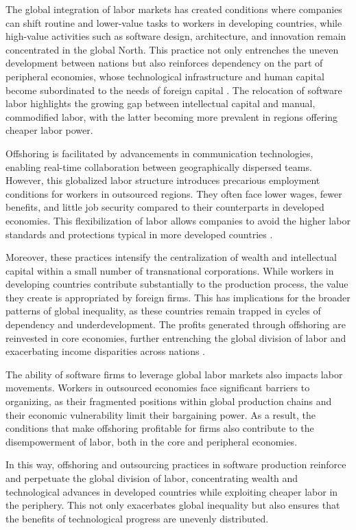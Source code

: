 \begin{refsection}
The global integration of labor markets has created conditions where companies can shift routine and lower-value tasks to workers in developing countries, while high-value activities such as software design, architecture, and innovation remain concentrated in the global North. This practice not only entrenches the uneven development between nations but also reinforces dependency on the part of peripheral economies, whose technological infrastructure and human capital become subordinated to the needs of foreign capital \cite[pp.~84-86]{mosco2009}. The relocation of software labor highlights the growing gap between intellectual capital and manual, commodified labor, with the latter becoming more prevalent in regions offering cheaper labor power.

Offshoring is facilitated by advancements in communication technologies, enabling real-time collaboration between geographically dispersed teams. However, this globalized labor structure introduces precarious employment conditions for workers in outsourced regions. They often face lower wages, fewer benefits, and little job security compared to their counterparts in developed economies. This flexibilization of labor allows companies to avoid the higher labor standards and protections typical in more developed countries \cite[pp.~124-127]{sassen2008}.

Moreover, these practices intensify the centralization of wealth and intellectual capital within a small number of transnational corporations. While workers in developing countries contribute substantially to the production process, the value they create is appropriated by foreign firms. This has implications for the broader patterns of global inequality, as these countries remain trapped in cycles of dependency and underdevelopment. The profits generated through offshoring are reinvested in core economies, further entrenching the global division of labor and exacerbating income disparities across nations \cite[pp.~89-91]{harvey2021}.

The ability of software firms to leverage global labor markets also impacts labor movements. Workers in outsourced economies face significant barriers to organizing, as their fragmented positions within global production chains and their economic vulnerability limit their bargaining power. As a result, the conditions that make offshoring profitable for firms also contribute to the disempowerment of labor, both in the core and peripheral economies.

In this way, offshoring and outsourcing practices in software production reinforce and perpetuate the global division of labor, concentrating wealth and technological advances in developed countries while exploiting cheaper labor in the periphery. This not only exacerbates global inequality but also ensures that the benefits of technological progress are unevenly distributed.


\end{refsection}
